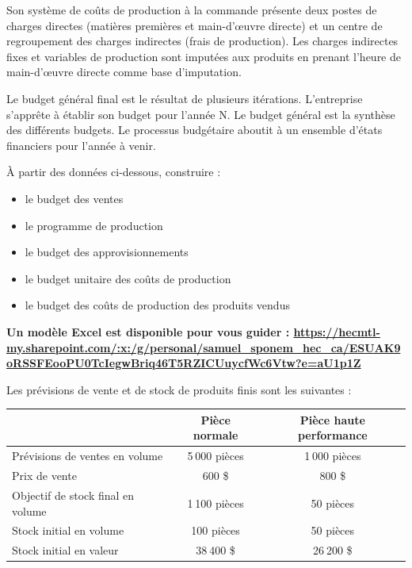 \documentclass[oneside]{kaobook}
\begin{document}
Son système de coûts de production à la commande présente deux postes de charges directes (matières premières et main-d’œuvre directe) et un centre de regroupement des charges indirectes (frais de production). Les charges indirectes fixes et variables de production sont imputées aux produits en prenant l’heure de main-d’œuvre directe comme base d’imputation.

Le budget général final est le résultat de plusieurs itérations. L’entreprise s’apprête à établir son budget pour l’année N. Le budget général est la synthèse des différents budgets. Le processus budgétaire aboutit à un ensemble d’états financiers pour l’année à venir.

\begin{kaobox}
À partir des données ci-dessous, construire :
\begin{itemize}
\item le budget des ventes
\item le programme de production
\item le budget des approvisionnements
\item le budget unitaire des coûts de production
\item le budget des coûts de production des produits vendus
\end{itemize}

\textbf{Un modèle Excel est disponible pour vous guider : \url{https://hecmtl-my.sharepoint.com/:x:/g/personal/samuel\_sponem\_hec\_ca/ESUAK9oRSSFEooPU0TcIegwBriq46T5RZICUuycfWc6Vtw?e=aU1p1Z}}
\end{kaobox}

Les prévisions de vente et de stock de produits finis sont les suivantes :

\begin{center}
\sidenotesize
\begin{tabular}{l c c}
 & Pièce normale & Pièce haute performance\\
\hline
Prévisions de ventes en volume & 5 000 pièces & 1 000 pièces\\
Prix de vente & 600 \$ & 800 \$\\
Objectif de stock final en volume & 1 100 pièces & 50 pièces\\
Stock initial en volume & 100 pièces & 50 pièces\\
Stock initial en valeur & 38 400 \$ & 26 200 \$\\
\end{tabular}
\end{center}
\end{document}
